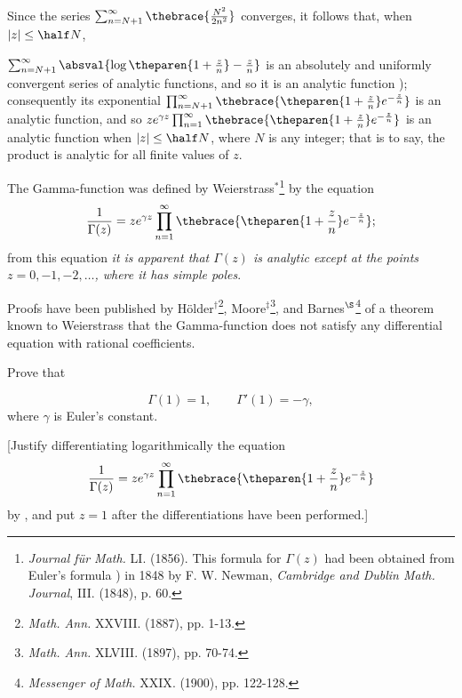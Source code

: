 Since the series $\sum_{n = N+1}^\infty
\thebrace{\frac{N^2}{2n^2}}$ converges, it follows that,  when
$|z| \le \half N$,

%
%

$\sum_{n = N+1}^\infty \absval{\log \theparen{1 + \frac{z}{n}} -
  \frac{z}{n}}$ is an absolutely and uniformly convergent series of
analytic functions, and so it is an analytic function
); consequently its exponential
$\prod_{n=N+1}^\infty \thebrace{\theparen{1 + \frac{z}{n}}
  e^{-\frac{z}{n}}}$ is an analytic function, and so
$ze^{\gamma z} \prod_{n=1}^\infty \thebrace{\theparen{1 +
    \frac{z}{n}}  e^{-\frac{z}{n}}}$ is an analytic function when
$|z| \le \half N$, where $N$ is any integer; that is to say, the
product is analytic for all finite values of $z$.

The Gamma-function was defined by
Weierstrass$^*$\footnote{\emph{Journal f\"ur Math.}
  \textsc{LI}. (1856). This formula for $\Gamma(z)$ had been obtained
  from Euler's formula ) in 1848 by
  F. W. Newman, \emph{Cambridge and Dublin Math. Journal},
  \textsc{III}.  (1848), p. 60.} %
by the equation
\begin{displaymath}
  \frac{1}{\Gamma(z)} = ze^{\gamma z} \prod_{n=1}^\infty
  \thebrace{\theparen{1 + \frac{z}{n}}  e^{-\frac{z}{n}}} ;
\end{displaymath}
 from this equation \emph{it is apparent that
$\Gamma(z)$ is analytic except at the points
  $z=0, -1, -2, \ldots$, where it has simple poles}.

Proofs have been published by
H\"older$^\dagger$\footnote{\emph{Math. Ann.}  \textsc{XXVIII.}
  (1887), pp. 1-13.}, %
Moore$^\ddagger$\footnote{\emph{Math. Ann.} \textsc{XLVIII.} (1897),
  pp. 70-74.}, %
and Barnes$^\S$\footnote{\emph{Messenger of Math.} \textsc{XXIX}. (1900),
  pp. 122-128.} %
of a theorem known to Weierstrass  that the Gamma-function does not satisfy any
differential equation with rational coefficients.

\begin{wandwexample}
  Prove that

  \begin{displaymath}
    \Gamma(1) = 1, \qquad \Gamma'(1)=-\gamma,
  \end{displaymath}
  where $\gamma$ is Euler's constant.

  [Justify differentiating logarithmically the equation
  \begin{displaymath}
    \frac{1}{\Gamma(z)} = ze^{\gamma z} \prod_{n=1}^\infty
    \thebrace{\theparen{1 + \frac{z}{n}}  e^{-\frac{z}{n}}} 
  \end{displaymath}
  by , and put $z = 1$ after the differentiations
  have been performed.]
\end{wandwexample}

